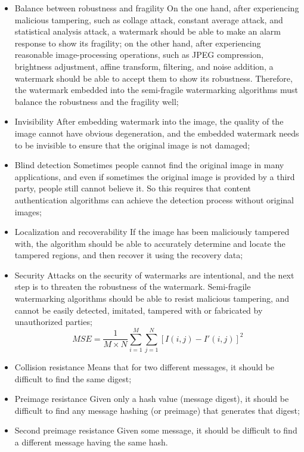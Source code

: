 \documentclass[draft, {\secondLanguage}, english]{volcanica-template}
\begin{document}
\begin{itemize}
    \item Balance between robustness and fragility 
On the one hand, after experiencing malicious tampering, such as collage attack, constant average attack, and statistical analysis attack, a watermark should be able to make an alarm response to show its fragility; on the other hand, after experiencing reasonable image-processing operations, such as JPEG compression, brightness adjustment, affine transform, filtering, and noise addition, a watermark should be able to accept them to show its robustness. Therefore, the watermark embedded into the semi-fragile watermarking algorithms must balance the robustness and the fragility well;
    \item Invisibility
After embedding watermark into the image, the quality of the image cannot have obvious degeneration, and the embedded watermark needs to be invisible to ensure that the original image is not damaged;
    \item Blind detection
Sometimes people cannot find the original image in many applications, and even if sometimes the original image is provided by a third party, people still cannot believe it. So this requires that content authentication algorithms can achieve the detection process without original images;
    \item Localization and recoverability
If the image has been maliciously tampered with, the algorithm should be able to accurately determine and locate the tampered regions, and then recover it using the recovery data;
    \item Security
Attacks on the security of watermarks are intentional, and the next step is to threaten the robustness of the watermark. Semi-fragile watermarking algorithms should be able to resist malicious tampering, and cannot be easily detected, imitated, tampered with or fabricated by unauthorized parties;
\begin{equation}
MSE = \frac{1}{M\times N}\sum_{i=1}^{M}\sum_{j=1}^{N}[I(i,j)-I'(i,j)]^2
\label{eq:03}
\end{equation}
                    
    \item Collision resistance
Means that for two different messages, it should be difficult to find the same digest; 
    \item Preimage resistance  
Given only a hash value (message digest), it should be difficult to find any message hashing (or preimage) that generates that digest;
\item Second preimage resistance
Given some message, it should be difficult to find a different message having the same hash.
\end{itemize}
\end{document}
